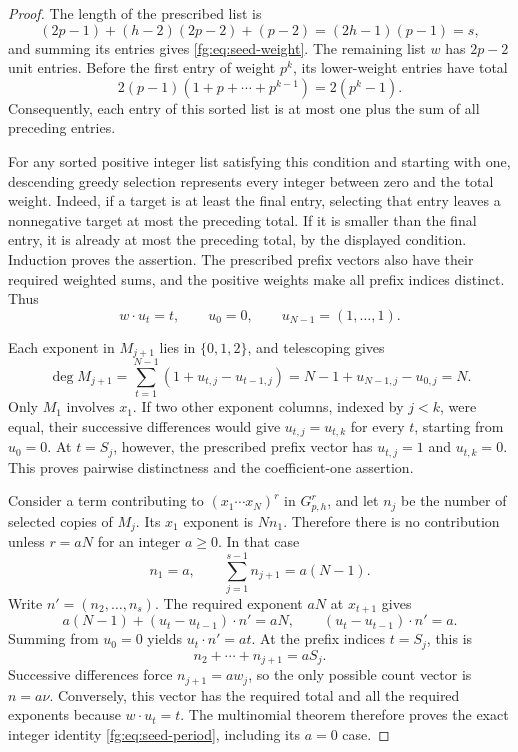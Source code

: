 \begin{proof}
The length of the prescribed list is
\[
 (2p-1)+(h-2)(2p-2)+(p-2)=(2h-1)(p-1)=s,
\]
and summing its entries gives \eqref{fg:eq:seed-weight}.
The remaining list $w$ has $2p-2$ unit entries. Before the first entry
of weight $p^k$, its lower-weight entries have total
\[
 2(p-1)(1+p+\cdots+p^{k-1})=2(p^k-1).
\]
Consequently, each entry of this sorted list is at most one plus the
sum of all preceding entries.

For any sorted positive integer list satisfying this condition and
starting with one, descending greedy selection represents every
integer between zero and the total weight. Indeed, if a target is at
least the final entry, selecting that entry leaves a nonnegative
target at most the preceding total. If it is smaller than the final
entry, it is already at most the preceding total, by the displayed
condition. Induction proves the assertion. The prescribed prefix
vectors also have their required weighted sums, and the positive
weights make all prefix indices distinct. Thus
\[
 w\cdot u_t=t,\qquad u_0=0,\qquad
 u_{N-1}=(1,\ldots,1).
\]

Each exponent in $M_{j+1}$ lies in $\{0,1,2\}$, and telescoping gives
\[
 \deg M_{j+1}
 =\sum_{t=1}^{N-1}(1+u_{t,j}-u_{t-1,j})
 =N-1+u_{N-1,j}-u_{0,j}=N.
\]
Only $M_1$ involves $x_1$. If two other exponent columns, indexed by
$j<k$, were equal, their successive differences would give
$u_{t,j}=u_{t,k}$ for every $t$, starting from $u_0=0$. At $t=S_j$,
however, the prescribed prefix vector has $u_{t,j}=1$ and $u_{t,k}=0$.
This proves pairwise distinctness and the coefficient-one assertion.

Consider a term contributing to
$(x_1\cdots x_N)^r$ in $G_{p,h}^r$, and let $n_j$ be the number of
selected copies of $M_j$. Its $x_1$ exponent is $Nn_1$. Therefore
there is no contribution unless $r=aN$ for an integer $a\ge0$.
In that case
\[
 n_1=a,\qquad \sum_{j=1}^{s-1}n_{j+1}=a(N-1).
\]
Write $n'=(n_2,\ldots,n_s)$. The required exponent $aN$ at
$x_{t+1}$ gives
\[
 a(N-1)+(u_t-u_{t-1})\cdot n'=aN,
 \qquad (u_t-u_{t-1})\cdot n'=a.
\]
Summing from $u_0=0$ yields $u_t\cdot n'=at$. At the prefix indices
$t=S_j$, this is
\[
 n_2+\cdots+n_{j+1}=aS_j.
\]
Successive differences force $n_{j+1}=aw_j$, so the only possible
count vector is $n=a\nu$. Conversely, this vector has the required
total and all the required exponents because $w\cdot u_t=t$.
The multinomial theorem therefore proves the exact integer identity
\eqref{fg:eq:seed-period}, including its $a=0$ case.


\end{proof}
